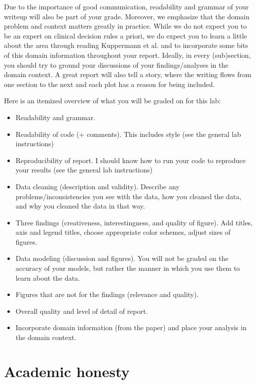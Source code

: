 \documentclass[10pt,letterpaper]{article}
\begin{document}
Due to the importance of good communication, readability and grammar of your writeup will also be part of your grade. Moreover, we emphasize that the domain problem and context matters greatly in practice. While we do not expect you to be an expert on clinical decision rules a priori, we do expect you to learn a little about the area through reading Kuppermann et al. and to incorporate some bits of this domain information throughout your report. Ideally, in every (sub)section, you should try to ground your discussions of your findings/analyses in the domain context. A great report will also tell a story, where the writing flows from one section to the next and each plot has a reason for being included.

Here is an itemized overview of what you will be graded on for this lab:
\begin{itemize}
    \item Readability and grammar.
    \item Readability of code (+ comments). This includes style (see the general lab instructions)
    \item Reproducibility of report. I should know how to run your code to reproduce your results (see the general lab instructions)
    \item Data cleaning (description and validity). Describe any problems/inconsistencies you see with the data, how you cleaned the data, and why you cleaned the data in that way.
    \item Three findings (creativeness, interestingness, and quality of figure). Add titles, axis and legend titles, choose appropriate color schemes, adjust sizes of figures.
    \item Data modeling (discussion and figures). You will not be graded on the accuracy of your models, but rather the manner in which you use them to learn about the data. 
    \item Figures that are not for the findings (relevance and quality).
    \item Overall quality and level of detail of report.
    \item Incorporate domain information (from the paper) and place your analysis in the domain context.
\end{itemize}

\section*{Academic honesty}
\end{document}
